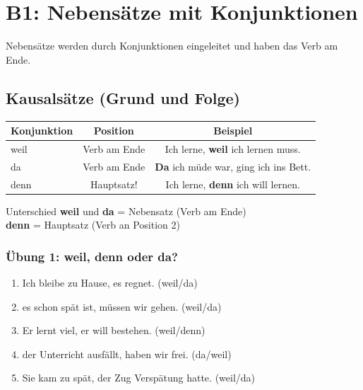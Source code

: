 \chapter{B1: Nebensätze mit Konjunktionen}
\label{cha:B1Nebensaetze}

Nebensätze werden durch Konjunktionen eingeleitet und haben das Verb am Ende.

\section{Kausalsätze (Grund und Folge)}
\label{sec:B1Kausal}

\begin{center}
\begin{tabular}{|l|c|c|}
\hline
Konjunktion & Position & Beispiel \\ \hline
weil & Verb am Ende & Ich lerne, \textbf{weil} ich lernen muss. \\ \hline
da & Verb am Ende & \textbf{Da} ich müde war, ging ich ins Bett. \\ \hline
denn & Hauptsatz! & Ich lerne, \textbf{denn} ich will lernen. \\ \hline
\end{tabular}
\end{center}

\begin{infobox}{Unterschied}
\textbf{weil} und \textbf{da} = Nebensatz (Verb am Ende)\\
\textbf{denn} = Hauptsatz (Verb an Position 2)
\end{infobox}

\subsection*{Übung 1: weil, denn oder da?}
\begin{enumerate}
    \item Ich bleibe zu Hause, \underline{\hspace{1cm}} es regnet. (weil/da)
    \item \underline{\hspace{1cm}} es schon spät ist, müssen wir gehen. (weil/da)
    \item Er lernt viel, \underline{\hspace{1cm}} er will bestehen. (weil/denn)
    \item \underline{\hspace{1cm}} der Unterricht ausfällt, haben wir frei. (da/weil)
    \item Sie kam zu spät, \underline{\hspace{1cm}} der Zug Verspätung hatte. (weil/da)
\end{enumerate}

